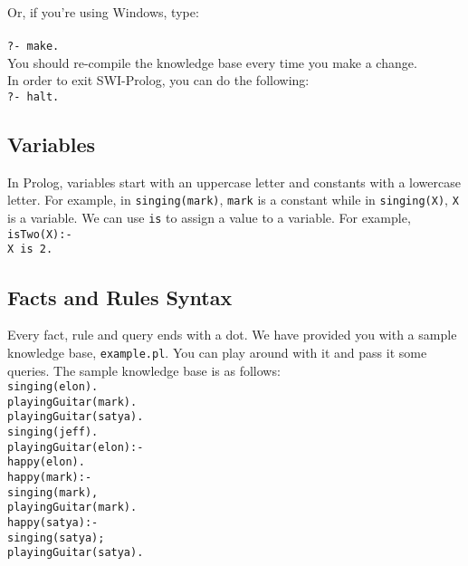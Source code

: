 \documentclass{article}
\newcommand\tab[1][1cm]{\hspace*{#1}}
\begin{document}
Or, if you're using Windows, type:\\\\
\verb|?- make. |\\

You should re-compile the knowledge base every time you make a change.\\

In order to exit SWI-Prolog, you can do the following:\\

\verb|?- halt. |\\

\subsection{Variables}
In Prolog, variables start with an uppercase letter and constants with a lowercase letter. For example, in \verb|singing(mark)|, \verb|mark| is a constant while in \verb|singing(X)|, \verb|X| is a variable.
We can use \verb|is| to assign a value to a variable. For example,\\

\verb|isTwo(X):-|\\
\tab \verb|X is 2.|

\subsection{Facts and Rules Syntax}
Every fact, rule and query ends with a dot. We have provided you with a sample knowledge base, \verb|example.pl|. You can play around with it and pass it some queries. The sample knowledge base is as follows:\\

\verb|singing(elon).|\\
\verb|playingGuitar(mark).|\\
\verb|playingGuitar(satya).|\\
\verb|singing(jeff).|\\

\verb|playingGuitar(elon):-|\\
\tab \verb|happy(elon).|\\ 

\verb|happy(mark):-|\\
\tab \verb|singing(mark),|\\
\tab \verb|playingGuitar(mark).|\\

\verb|happy(satya):-|\\
\tab \verb|singing(satya);|\\
\tab \verb|playingGuitar(satya).|\\
\end{document}
